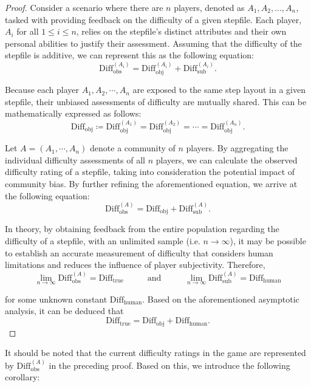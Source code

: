 \begin{proof}

Consider a scenario where there are $n$ players, denoted as $A_1, A_2,\ldots,A_n$, tasked with providing feedback on the difficulty of a given stepfile. Each player, $A_i$ for all $1 \leq i \leq n$, relies on the stepfile's distinct attributes and their own personal abilities to justify their assessment. Assuming that the difficulty of the stepfile is additive, we can represent this as the following equation:
$$\text{Diff}_{\text{obs}}^{(A_i)} = \text{Diff}_{\text{obj}}^{(A_i)} + \text{Diff}_{\text{sub}}^{(A_i)}.$$

Because each player $A_1, A_2, \cdots, A_n$ are exposed to the same step layout in a given stepfile, their unbiased assessments of difficulty are mutually shared. This can be mathematically expressed as follows:
$$\text{Diff}_{\text{obj}} \coloneq \text{Diff}_{\text{obj}}^{(A_1)} = \text{Diff}_{\text{obj}}^{(A_2)} = \cdots = \text{Diff}_{\text{obj}}^{(A_n)}.$$

Let $A = (A_1, \cdots, A_n)$ denote a community of $n$ players. By aggregating the individual difficulty assessments of all $n$ players, we can calculate the observed difficulty rating of a stepfile, taking into consideration the potential impact of community bias. By further refining the aforementioned equation, we arrive at the following equation:
$$\text{Diff}_{\text{obs}}^{(A)} = \text{Diff}_{\text{obj}} + \text{Diff}_{\text{sub}}^{(A)}.$$

In theory, by obtaining feedback from the entire population regarding the difficulty of a stepfile, with an unlimited sample (i.e. $n \rightarrow \infty$), it may be possible to establish an accurate measurement of difficulty that considers human limitations and reduces the influence of player subjectivity. Therefore, 
$$\lim_{n \rightarrow \infty} \text{Diff}_{\text{obs}}^{(A)} = \text{Diff}_{\text{true}}\mspace{50mu} \text{and} \mspace{50mu} \lim_{n \rightarrow \infty} \text{Diff}_{\text{sub}}^{(A)} = \text{Diff}_{\text{human}}$$

for some unknown constant $\text{Diff}_{\text{human}}$. Based on the aforementioned asymptotic analysis, it can be deduced that
$$\text{Diff}_{\text{true}} = \text{Diff}_{\text{obj}} + \text{Diff}_{\text{human}}.$$
\end{proof}

It should be noted that the current difficulty ratings in the game are represented by $\text{Diff}_{\text{obs}}^{(A)}$ in the preceding proof. Based on this, we introduce the following corollary:

